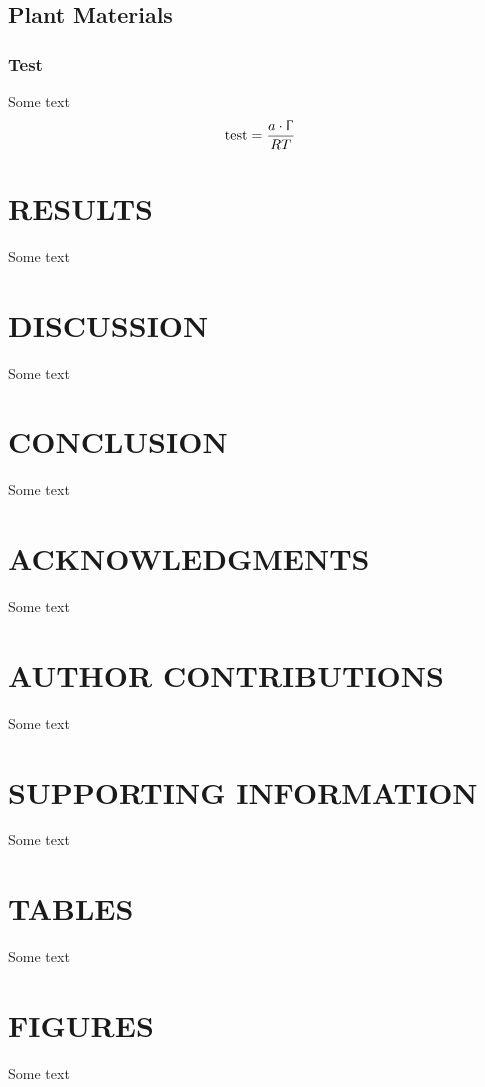 \documentclass[nummaxdoi]{emerald}
\begin{document}
\subsection{Plant Materials}
\subsubsection{Test}
\par Some text
\begin{equation}
	\text{test} = \dfrac{a \cdot \Upgamma}{RT}
\end{equation}




\section{RESULTS}
\par Some text




\section{DISCUSSION}
\par Some text




\section{CONCLUSION}
\par Some text




\clearpage
\section*{ACKNOWLEDGMENTS}
\par Some text




\section*{AUTHOR CONTRIBUTIONS}
\par Some text




\section*{SUPPORTING INFORMATION}
\par Some text




\clearpage
\section*{TABLES}
\par Some text




\clearpage
\begin{singlespace}

\end{singlespace}




\clearpage
\section*{FIGURES}
\par Some text
\end{document}
